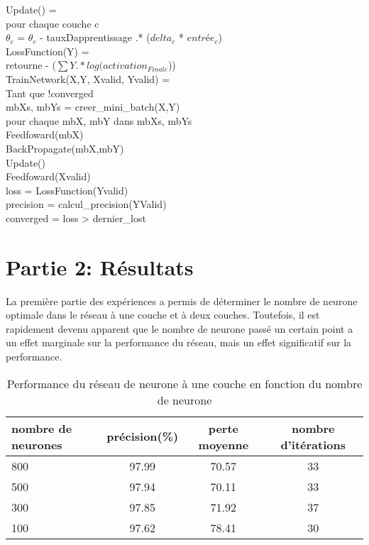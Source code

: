\documentclass[a4paper, 12pt]{article} %
\newcommand\tab[1][1cm]{\hspace*{#1}}
\begin{document}
Update() = \\
\tab	pour chaque couche c \\
\tab\tab	$\theta_{c}$ = $\theta_{c}$ - tauxDapprentissage .* ($delta_{c}$ * $entrée_{c}$)\\

LossFunction(Y) = \\
\tab	retourne - ($\sum{Y .* log(activation_{Finale}}$)) \\

TrainNetwork(X,Y, Xvalid, Yvalid) = \\
\tab Tant que !converged    \\
\tab\tab    mbXs, mbYs = creer\_mini\_batch(X,Y)    \\
\tab\tab    pour chaque mbX, mbY dans mbXs, mbYs    \\
\tab\tab\tab    Feedfoward(mbX) \\
\tab\tab\tab    BackPropagate(mbX,mbY)  \\
\tab\tab\tab    Update()    \\
\tab\tab    Feedfoward(Xvalid)  \\
\tab\tab    loss = LossFunction(Yvalid) \\
\tab\tab    precision = calcul\_precision(YValid)    \\
\tab\tab    converged = loss > dernier\_lost

\section*{Partie 2: Résultats}
La première partie des expériences a permis de déterminer le nombre de neurone optimale dans le réseau à une couche
et à deux couches. Toutefois, il est rapidement devenu apparent que le nombre de neurone passé un certain point
a un effet marginale sur la performance du réseau, mais un effet significatif sur la performance.

\begin{table}[H]
\centering
\caption{Performance du réseau de neurone à une couche en fonction du nombre de neurone}
    \begin{tabular}{|l|c|c|c|}
        \hline
    	nombre de neurones & précision(\%) & perte moyenne & nombre d'itérations\\
    	\hline
    	800	    &	97.99    & 70.57 & 33\\
    	\hline
    	500		&	97.94	& 70.11 & 33\\
    	\hline
    	300		&	97.85	& 71.92 & 37\\ 
    	\hline
	    100		&	97.62	& 78.41 & 30\\
    	\hline
    \end{tabular}
\end{table}
\end{document}
